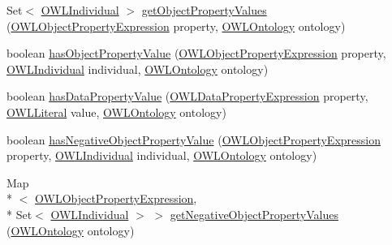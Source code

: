 \begin{DoxyCompactItemize}
\item 
Set$<$ \hyperlink{interfaceorg_1_1semanticweb_1_1owlapi_1_1model_1_1_o_w_l_individual}{O\-W\-L\-Individual} $>$ \hyperlink{interfaceorg_1_1semanticweb_1_1owlapi_1_1model_1_1_o_w_l_individual_a6ef0cbe42ee113f72c9606bea577725c}{get\-Object\-Property\-Values} (\hyperlink{interfaceorg_1_1semanticweb_1_1owlapi_1_1model_1_1_o_w_l_object_property_expression}{O\-W\-L\-Object\-Property\-Expression} property, \hyperlink{interfaceorg_1_1semanticweb_1_1owlapi_1_1model_1_1_o_w_l_ontology}{O\-W\-L\-Ontology} ontology)
\item 
boolean \hyperlink{interfaceorg_1_1semanticweb_1_1owlapi_1_1model_1_1_o_w_l_individual_a8380f0efd6d91c219969723e3c372d84}{has\-Object\-Property\-Value} (\hyperlink{interfaceorg_1_1semanticweb_1_1owlapi_1_1model_1_1_o_w_l_object_property_expression}{O\-W\-L\-Object\-Property\-Expression} property, \hyperlink{interfaceorg_1_1semanticweb_1_1owlapi_1_1model_1_1_o_w_l_individual}{O\-W\-L\-Individual} individual, \hyperlink{interfaceorg_1_1semanticweb_1_1owlapi_1_1model_1_1_o_w_l_ontology}{O\-W\-L\-Ontology} ontology)
\item 
boolean \hyperlink{interfaceorg_1_1semanticweb_1_1owlapi_1_1model_1_1_o_w_l_individual_aa3593b69abe50b0168a8ec487ac408e4}{has\-Data\-Property\-Value} (\hyperlink{interfaceorg_1_1semanticweb_1_1owlapi_1_1model_1_1_o_w_l_data_property_expression}{O\-W\-L\-Data\-Property\-Expression} property, \hyperlink{interfaceorg_1_1semanticweb_1_1owlapi_1_1model_1_1_o_w_l_literal}{O\-W\-L\-Literal} value, \hyperlink{interfaceorg_1_1semanticweb_1_1owlapi_1_1model_1_1_o_w_l_ontology}{O\-W\-L\-Ontology} ontology)
\item 
boolean \hyperlink{interfaceorg_1_1semanticweb_1_1owlapi_1_1model_1_1_o_w_l_individual_a15a270abb78896678962f9106ef8a712}{has\-Negative\-Object\-Property\-Value} (\hyperlink{interfaceorg_1_1semanticweb_1_1owlapi_1_1model_1_1_o_w_l_object_property_expression}{O\-W\-L\-Object\-Property\-Expression} property, \hyperlink{interfaceorg_1_1semanticweb_1_1owlapi_1_1model_1_1_o_w_l_individual}{O\-W\-L\-Individual} individual, \hyperlink{interfaceorg_1_1semanticweb_1_1owlapi_1_1model_1_1_o_w_l_ontology}{O\-W\-L\-Ontology} ontology)
\item 
Map\\*
$<$ \hyperlink{interfaceorg_1_1semanticweb_1_1owlapi_1_1model_1_1_o_w_l_object_property_expression}{O\-W\-L\-Object\-Property\-Expression}, \\*
Set$<$ \hyperlink{interfaceorg_1_1semanticweb_1_1owlapi_1_1model_1_1_o_w_l_individual}{O\-W\-L\-Individual} $>$ $>$ \hyperlink{interfaceorg_1_1semanticweb_1_1owlapi_1_1model_1_1_o_w_l_individual_a6d30cae5655a730bd8a5682e04213528}{get\-Negative\-Object\-Property\-Values} (\hyperlink{interfaceorg_1_1semanticweb_1_1owlapi_1_1model_1_1_o_w_l_ontology}{O\-W\-L\-Ontology} ontology)

\end{DoxyCompactItemize}
